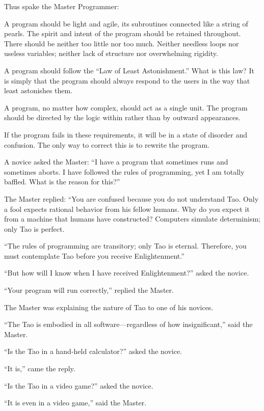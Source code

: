 Thus spake the Master Programmer:

A program should be light and agile, its subroutines connected like a string of pearls. The spirit and intent of the program should be retained throughout. There should be neither too little nor too much. Neither needless loops nor useless variables; neither lack of structure nor overwhelming rigidity.

A program should follow the ``Law of Least Astonishment.'' What is this law? It is simply that the program should always respond to the users in the way that least astonishes them.

A program, no matter how complex, should act as a single unit. The program should be directed by the logic within rather than by outward appearances.

If the program fails in these requirements, it will be in a state of disorder and confusion. The only way to correct this is to rewrite the program.

A novice asked the Master: ``I have a program that sometimes runs and sometimes aborts. I have followed the rules of programming, yet I am totally baffled. What is the reason for this?''

The Master replied: ``You are confused because you do not understand Tao. Only a fool expects rational behavior from his fellow humans. Why do you expect it from a machine that humans have constructed? Computers simulate determinism; only Tao is perfect.

``The rules of programming are transitory; only Tao is eternal. Therefore, you must contemplate Tao before you receive Enlightenment.''

``But how will I know when I have received Enlightenment?'' asked the novice.

``Your program will run correctly,'' replied the Master.

The Master was explaining the nature of Tao to one of his novices.

``The Tao is embodied in all software---regardless of how insignificant,'' said the Master.

``Is the Tao in a hand-held calculator?'' asked the novice.

``It is,'' came the reply.

``Is the Tao in a video game?'' asked the novice.

``It is even in a video game,'' said the Master.

